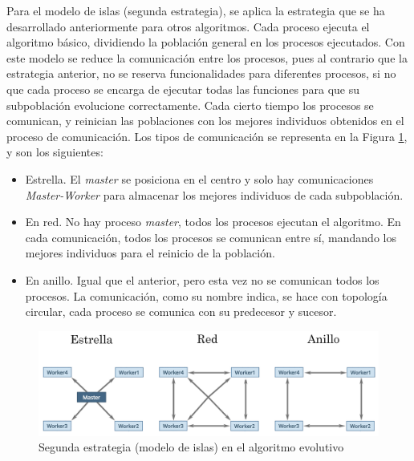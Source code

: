 	Para el modelo de islas (segunda estrategia), se aplica la estrategia que se ha desarrollado anteriormente para otros algoritmos. Cada proceso ejecuta el algoritmo básico, dividiendo la población general en los procesos ejecutados. Con este modelo se reduce la comunicación entre los procesos, pues al contrario que la estrategia anterior, no se reserva funcionalidades para diferentes procesos, si no que cada proceso se encarga de ejecutar todas las funciones para que su subpoblación evolucione correctamente. Cada cierto tiempo los procesos se comunican, y reinician las poblaciones con los mejores individuos obtenidos en el proceso de comunicación. Los tipos de comunicación se representa en la Figura \ref{fig:pev3_mpi2}, y son los siguientes: 

	\begin{itemize}
		\item Estrella. El \textit{master} se posiciona en el centro y solo hay comunicaciones \textit{Master-Worker} para almacenar los mejores individuos de cada subpoblación.
		\item En red. No hay proceso \textit{master}, todos los procesos ejecutan el algoritmo. En cada comunicación, todos los procesos se comunican entre sí, mandando los mejores individuos para el reinicio de la población.
		\item En anillo. Igual que el anterior, pero esta vez no se comunican todos los procesos. La comunicación, como su nombre indica, se hace con topología circular, cada proceso se comunica con su predecesor y sucesor.
	\end{itemize}
	
	\begin{figure}[!h]
		\centering
		\includegraphics[width=\textwidth]{images/chapter_3/pev_mpi2}
		\caption{Segunda estrategia (modelo de islas) en el algoritmo evolutivo}
		\label{fig:pev3_mpi2}
	\end{figure}
	
